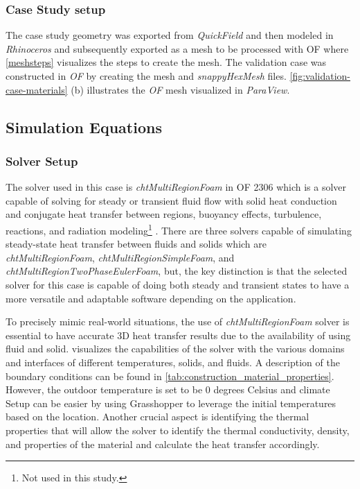 \subsubsection{Case Study setup}
The case study geometry was exported from \textit{QuickField} and then modeled in \textit{Rhinoceros} and subsequently exported as a mesh to be processed with  \gls{OF} where \ref{meshsteps} visualizes the steps to create the mesh. 
The validation case was constructed in \textit{ \gls{OF}} by creating the mesh and \textit{snappyHexMesh} files.  
\ref{fig:validation-case-materials}  (b) illustrates the \textit{\gls{OF}} mesh visualized in \textit{ParaView}.
    



\subsection{Simulation Equations}

\subsubsection{Solver Setup}
The solver used in this case is \textit{chtMultiRegionFoam} in  \gls{OF} 2306 which is a solver capable of solving for steady or transient fluid flow with solid heat conduction and conjugate heat transfer between regions, buoyancy effects, turbulence, reactions, and radiation modeling\footnote{Not used in this study.} \cite{cht}.
There are three solvers capable of simulating steady-state heat transfer between fluids and solids which are \textit{chtMultiRegionFoam}, \textit{chtMultiRegionSimpleFoam}, and \textit{chtMultiRegionTwoPhaseEulerFoam}, but, the key distinction is that the selected solver for this case is capable of doing both steady and transient states to have a more versatile and adaptable software depending on the application. 


To precisely mimic real-world situations, the use of \textit{ chtMultiRegionFoam} solver is essential to have accurate 3D heat transfer results due to the availability of using fluid and solid.  visualizes the capabilities of the solver with the various domains and interfaces of different temperatures, solids, and fluids. 
A description of the boundary conditions can be found in \cref{tab:construction_material_properties}. 
However, the outdoor temperature is set to be 0 degrees Celsius and climate Setup can be easier by using Grasshopper to leverage the initial temperatures based on the location. 
Another crucial aspect is identifying the thermal properties that will allow the solver to identify the thermal conductivity, density, and properties of the material and calculate the heat transfer accordingly.

